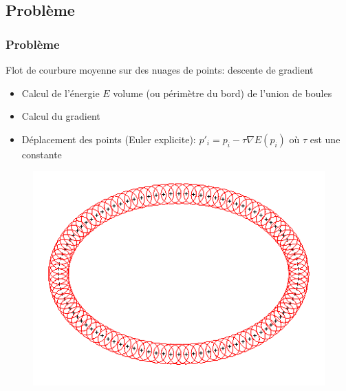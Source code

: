 \documentclass{beamer}
\begin{document}
\subsection{Problème}
\begin{frame}
    \frametitle{Problème}

    Flot de courbure moyenne sur des nuages de points: descente de gradient
    \begin{itemize}
        \item Calcul de l'énergie $ E $ volume (ou périmètre du bord) de l'union de boules
        \item Calcul du gradient
        \item Déplacement des points (Euler explicite): $ p'_i = p_i - \tau \nabla E (p_i) $ où $
            \tau $ est une constante
    \end{itemize}

    \begin{figure}
        \centering
        \includegraphics[scale=0.28]{img/ellipse-balls-15}
    \end{figure}
\end{frame}
\end{document}
